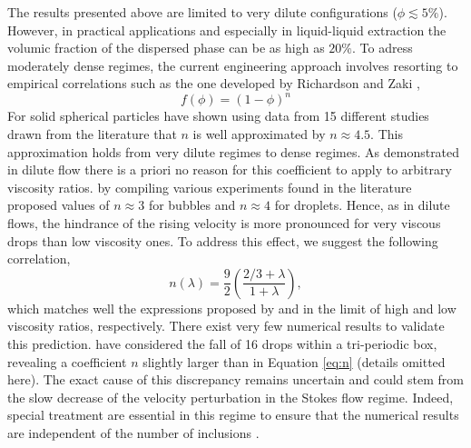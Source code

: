 The results presented above are limited to very dilute configurations ($\phi \lesssim 5 \%$). However, in practical applications and especially in liquid-liquid extraction the volumic fraction of the dispersed phase can be as high as $20\%$. To adress moderately dense regimes, the current engineering approach involves resorting to empirical correlations such as the one developed by Richardson and Zaki  \citep{richardson1954},
\begin{equation}
f(\phi) = (1-\phi)^n
\label{eq:Richardson} 
\end{equation}
For solid spherical particles \citet{brzinski2018} have shown using data from 15 different studies drawn from the literature that $n$ is well approximated by $n\approx 4.5$. This approximation holds from very dilute regimes to dense regimes. As demonstrated in dilute flow there is a priori no reason for this coefficient to apply to arbitrary viscosity ratios. \citet{ishii1979drag} by compiling various experiments found in the literature proposed values of $n\approx 3$ for bubbles and $n \approx 4$ for droplets. 
Hence, as in dilute flows, the hindrance of the rising velocity is more pronounced for very viscous drops than low viscosity ones. 
To address this effect, we suggest the following correlation, 
\begin{equation}
n(\lambda) = \frac{9}{2}\left(\frac{2/3+\lambda}{1+\lambda}\right),
\label{eq:n}
\end{equation} 
which matches well the expressions proposed by \citet{brzinski2018} and \citet{ishii1979drag} in the limit of high and low viscosity ratios, respectively. 
There exist very few numerical results to validate this prediction. 
\citet{mo1994} have considered the fall of 16 drops within a tri-periodic box, revealing a coefficient $n$ slightly larger than in Equation \ref{eq:n} (details omitted here). 
The exact cause of this discrepancy remains uncertain and could stem from the slow decrease of the velocity perturbation in the Stokes flow regime. 
Indeed, special treatment are essential in this regime to ensure that the numerical results are independent of the number of inclusions \citet{mo1994}.

